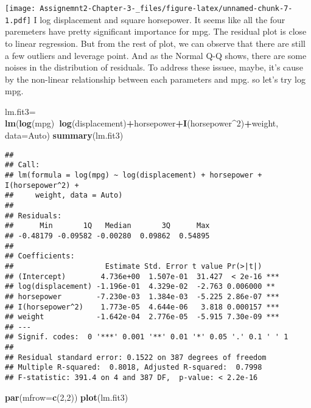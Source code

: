 \documentclass[]{article}
\newenvironment{Shaded}{\begin{snugshade}}{\end{snugshade}}
\newcommand{\DataTypeTok}[1]{\textcolor[rgb]{0.13,0.29,0.53}{#1}}
\newcommand{\DecValTok}[1]{\textcolor[rgb]{0.00,0.00,0.81}{#1}}
\newcommand{\KeywordTok}[1]{\textcolor[rgb]{0.13,0.29,0.53}{\textbf{#1}}}
\newcommand{\NormalTok}[1]{#1}
\newcommand{\OperatorTok}[1]{\textcolor[rgb]{0.81,0.36,0.00}{\textbf{#1}}}
\newcommand{\StringTok}[1]{\textcolor[rgb]{0.31,0.60,0.02}{#1}}
\begin{document}
\texttt{[image: Assignemnt2-Chapter-3-\_files/figure-latex/unnamed-chunk-7-1.pdf]}
I log displacement and square horsepower. It seems like all the four
paremeters have pretty significant importance for mpg. The residual plot
is close to linear regression. But from the rest of plot, we can observe
that there are still a few outliers and leverage point. And as the
Normal Q-Q shows, there are some noises in the distribution of
residuals. To address these issuee, maybe, it's cause by the non-linear
relationship between each parameters and mpg. so let's try log mpg.

\begin{Shaded}
\begin{Highlighting}[]
\NormalTok{lm.fit3=}\StringTok{ }\KeywordTok{lm}\NormalTok{(}\KeywordTok{log}\NormalTok{(mpg)}\OperatorTok{~}\KeywordTok{log}\NormalTok{(displacement)}\OperatorTok{+}\NormalTok{horsepower}\OperatorTok{+}\KeywordTok{I}\NormalTok{(horsepower}\OperatorTok{^}\DecValTok{2}\NormalTok{)}\OperatorTok{+}\NormalTok{weight, }\DataTypeTok{data=}\NormalTok{Auto)}
\KeywordTok{summary}\NormalTok{(lm.fit3)}
\end{Highlighting}
\end{Shaded}

\begin{verbatim}
## 
## Call:
## lm(formula = log(mpg) ~ log(displacement) + horsepower + I(horsepower^2) + 
##     weight, data = Auto)
## 
## Residuals:
##      Min       1Q   Median       3Q      Max 
## -0.48179 -0.09582 -0.00280  0.09862  0.54895 
## 
## Coefficients:
##                     Estimate Std. Error t value Pr(>|t|)    
## (Intercept)        4.736e+00  1.507e-01  31.427  < 2e-16 ***
## log(displacement) -1.196e-01  4.329e-02  -2.763 0.006000 ** 
## horsepower        -7.230e-03  1.384e-03  -5.225 2.86e-07 ***
## I(horsepower^2)    1.773e-05  4.644e-06   3.818 0.000157 ***
## weight            -1.642e-04  2.776e-05  -5.915 7.30e-09 ***
## ---
## Signif. codes:  0 '***' 0.001 '**' 0.01 '*' 0.05 '.' 0.1 ' ' 1
## 
## Residual standard error: 0.1522 on 387 degrees of freedom
## Multiple R-squared:  0.8018, Adjusted R-squared:  0.7998 
## F-statistic: 391.4 on 4 and 387 DF,  p-value: < 2.2e-16
\end{verbatim}

\begin{Shaded}
\begin{Highlighting}[]
\KeywordTok{par}\NormalTok{(}\DataTypeTok{mfrow=}\KeywordTok{c}\NormalTok{(}\DecValTok{2}\NormalTok{,}\DecValTok{2}\NormalTok{))}
\KeywordTok{plot}\NormalTok{(lm.fit3)}
\end{Highlighting}
\end{Shaded}
\end{document}
